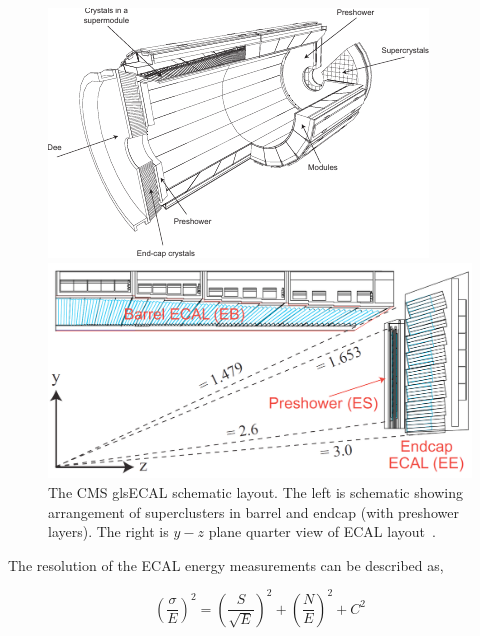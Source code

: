 \begin{figure}[!ht]
  \centering
  \begin{minipage}[c]{.60\textwidth}
    \includegraphics[width=\textwidth]{figures/cms_ecal_schematic.pdf}
  \end{minipage}
  \begin{minipage}[c]{.38\textwidth}
    \includegraphics[width=\textwidth]{figures/cms_ecal_layout.png}
  \end{minipage}
  \caption[The CMS gls{ECAL} schematic layout]%
  {The \gls{CMS} gls{ECAL} schematic layout. The left is schematic showing arrangement of
    superclusters in barrel and endcap (with preshower layers). The right is \(y-z \)
    plane quarter view of \gls{ECAL} layout~\cite{image-cms-ecal-layout}.}%
  \label{fig:cms-ecal-schematic}
\end{figure}

The resolution of the \gls{ECAL} energy measurements can be described as,

\begin{equation}
  {\left( \frac{\sigma}{E} \right)}^2
  = {\left( \frac{S}{\sqrt{E}} \right)}^2
  + {\left( \frac{N}{E} \right)}^2
  + C^2
\end{equation}

